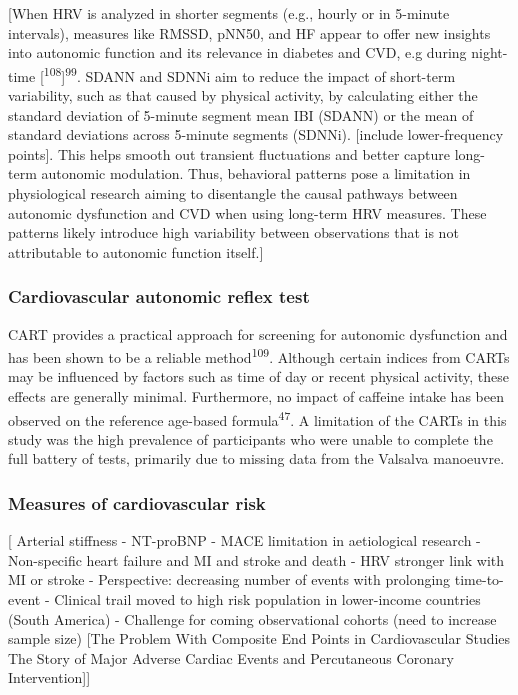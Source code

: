\documentclass[
  a4paper,
  headsepline=true,
  open=any]{scrbook}
\begin{document}
{[}When HRV is analyzed in shorter segments (e.g., hourly or in 5-minute
intervals), measures like RMSSD, pNN50, and HF appear to offer new
insights into autonomic function and its relevance in diabetes and CVD,
e.g during night-time {[}\textsuperscript{108}{]}\textsuperscript{99}.
SDANN and SDNNi aim to reduce the impact of short-term variability, such
as that caused by physical activity, by calculating either the standard
deviation of 5-minute segment mean IBI (SDANN) or the mean of standard
deviations across 5-minute segments (SDNNi). {[}include lower-frequency
points{]}. This helps smooth out transient fluctuations and better
capture long-term autonomic modulation. Thus, behavioral patterns pose a
limitation in physiological research aiming to disentangle the causal
pathways between autonomic dysfunction and CVD when using long-term HRV
measures. These patterns likely introduce high variability between
observations that is not attributable to autonomic function itself.{]}

\hypertarget{cardiovascular-autonomic-reflex-test}{%
\subsubsection{Cardiovascular autonomic reflex
test}\label{cardiovascular-autonomic-reflex-test}}

CART provides a practical approach for screening for autonomic
dysfunction and has been shown to be a reliable
method\textsuperscript{109}. Although certain indices from CARTs may be
influenced by factors such as time of day or recent physical activity,
these effects are generally minimal. Furthermore, no impact of caffeine
intake has been observed on the reference age-based
formula\textsuperscript{47}. A limitation of the CARTs in this study was
the high prevalence of participants who were unable to complete the full
battery of tests, primarily due to missing data from the Valsalva
manoeuvre.

\hypertarget{measures-of-cardiovascular-risk}{%
\subsubsection{Measures of cardiovascular
risk}\label{measures-of-cardiovascular-risk}}

{[} Arterial stiffness - NT-proBNP - MACE limitation in aetiological
research - Non-specific heart failure and MI and stroke and death - HRV
stronger link with MI or stroke - Perspective: decreasing number of
events with prolonging time-to-event - Clinical trail moved to high risk
population in lower-income countries (South America) - Challenge for
coming observational cohorts (need to increase sample size) {[}The
Problem With Composite End Points in Cardiovascular Studies The Story of
Major Adverse Cardiac Events and Percutaneous Coronary
Intervention{]}{]}
\end{document}
